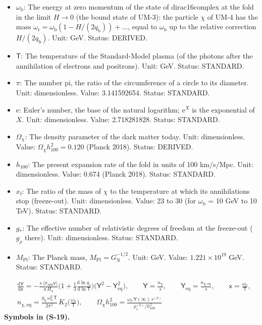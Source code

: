 \documentclass[
  10pt,
]{article}
\begin{document}
\begin{itemize}
  the fold that are in thermal equilibrium. Unit: dimensionless. Value:
  8 (four particles and four antiparticles). Status: DERIVED.
\item
  \(\omega_{\mathrm{b}}\): The energy at zero momentum of the state of
  dirac16complex at the fold in the limit \(H \to 0\) (the bound state
  of UM-3): the particle \(\chi\) of UM-4 has the mass
  \(\omega_{\mathrm{r}} = \omega_{\mathrm{b}}(1 - H/(2q_{\mathrm{b}})) + \dots\),
  equal to \(\omega_{\mathrm{b}}\) up to the relative correction
  \(H/(2q_{\mathrm{b}})\). Unit: GeV. Status: DERIVED.
\item
  \(\mathsf{T}\): The temperature of the Standard-Model plasma (of the
  photons after the annihilation of electrons and positrons). Unit: GeV.
  Status: STANDARD.
\item
  \(\pi\): The number pi, the ratio of the circumference of a circle to
  its diameter. Unit: dimensionless. Value: 3.141592654. Status:
  STANDARD.
\item
  \(\mathrm{e}\): Euler's number, the base of the natural logarithm;
  \(\mathrm{e}^{X}\) is the exponential of \(X\). Unit: dimensionless.
  Value: 2.718281828. Status: STANDARD.
\item
  \(\Omega_\chi\): The density parameter of the dark matter today. Unit:
  dimensionless. Value: \(\Omega_\chi h_{100}^2 = 0.120\) (Planck 2018).
  Status: DERIVED.
\item
  \(h_{100}\): The present expansion rate of the fold in units of 100
  km/s/Mpc. Unit: dimensionless. Value: 0.674 (Planck 2018). Status:
  STANDARD.
\item
  \(x_{\mathrm{f}}\): The ratio of the mass of \(\chi\) to the
  temperature at which its annihilations stop (freeze-out). Unit:
  dimensionless. Value: 23 to 30 (for \(\omega_{\mathrm{b}}\) = 10 GeV
  to 10 TeV). Status: STANDARD.
\item
  \(g_*\): The effective number of relativistic degrees of freedom at
  the freeze-out (\(g_\rho\) there). Unit: dimensionless. Status:
  STANDARD.
\item
  \(M_{\mathrm{Pl}}\): The Planck mass,
  \(M_{\mathrm{Pl}} = G_{\mathrm{N}}^{-1/2}\). Unit: GeV. Value:
  \(1.221\times10^{19}\) GeV. Status: STANDARD.
\end{itemize}

\[
\begin{aligned}
&\frac{\mathrm{d}\mathsf{Y}}{\mathrm{d}\mathsf{x}} = -\frac{s\,\langle\sigma_{\mathrm{ann}}\mathsf{v}\rangle}{\mathsf{x}\,H_4}\Big(1 + \frac13\frac{\mathrm{d}\ln g_{\mathrm{s}}}{\mathrm{d}\ln\mathsf{T}}\Big)
 \big(\mathsf{Y}^2 - \mathsf{Y}_{\mathrm{eq}}^2\big),\qquad \mathsf{Y} = \frac{n_\chi}{s},\qquad \mathsf{Y}_{\mathrm{eq}} = \frac{n_{\chi,\mathrm{eq}}}{s},\qquad \mathsf{x} = \frac{\omega_{\mathrm{b}}}{\mathsf{T}},\\
&n_{\chi,\mathrm{eq}} = \frac{g_\chi\,\omega_{\mathrm{b}}^2\,\mathsf{T}}{2\pi^2}\,K_2\Big(\frac{\omega_{\mathrm{b}}}{\mathsf{T}}\Big),\qquad
 \Omega_\chi h_{100}^2 = \frac{\omega_{\mathrm{b}}\,\mathsf{Y}(\infty)\,s^{(0)}}{\rho_{\mathrm{c}}^{(0)}/h_{100}^2}
\end{aligned} \tag{S-19}
\] \textbf{Symbols in (S-19).}
\end{document}
